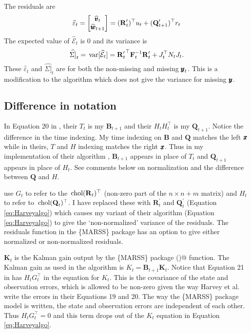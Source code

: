 \documentclass[]{article}
\def\UPS{\mbox{\boldmath $\Upsilon$}}
\def\BB{\mbox{$\mathbf B$}}	\def\bb{\mbox{$\mathbf b$}} \def\Bb{\mbox{$\mathbf J$}} \def\Ba{\mbox{$\mathbf L$}} \def\Bm{\UPS}
\def\FF{\mbox{$\mathbf F$}} \def\ff{\mbox{$\mathbf f$}}
\def\KK{\mbox{$\mathbf K$}}
\def\QQ{\mbox{$\mathbf Q$}}	 \def\qq{\mbox{$\mathbf q$}} \def\Qb{\mbox{$\mathbf G$}}  \def\Qm{\mathbb{Q}}
\def\RR{\mbox{$\mathbf R$}}	 \def\rr{\mbox{$\mathbf r$}} \def\Rb{\mbox{$\mathbf H$}}	\def\Rm{\mathbb{R}}
\def\chol{\,\textup{\textrm{chol}}}
\def\var{\,\textup{\textrm{var}}}
\def\hatwtp{\widehat{\ww}_{t+1}}
\def\hatvt{\widehat{\vv}_t}
\begin{document}
The residuals \citep[eqn 24]{Harveyetal1998} are
\begin{equation}\label{eq:Harveyresiduals}
\widehat{\varepsilon}_t = \begin{bmatrix}\hatvt\\ \hatwtp \end{bmatrix} =({\RR^\prime_t})^\top u_t + ({\QQ^\prime_{t+1}})^\top r_t
\end{equation}
The expected value of $\widehat{\mathcal{E}}_t$ is 0 and its variance is
\begin{equation}\label{eq:Harveyvariance}
\widehat{\Sigma]}_t = \var[\widehat{\mathcal{E}}_t] ={\RR^\prime_t}^\top \FF_t^{-1} \RR^\prime_t + J_t^\top N_t J_t .
\end{equation}
These $\widehat{\varepsilon}_t$ and $\widehat{\Sigma]}_t$ are for both the non-missing and missing $\mbox{$\pmb{y}$}_t$. This is a modification to the \citet{Harveyetal1998} algorithm which does not give the variance for missing $\mbox{$\pmb{y}$}$.

\subsection{Difference in notation}

In Equation 20 in \citet{Harveyetal1998}, their $T_t$ is my $\BB_{t+1}$ and their $H_t H_t^\top$ is my $\QQ_{t+1}$.  Notice the difference in the time indexing. My time indexing on $\BB$ and $\QQ$ matches the left $\mbox{$\pmb{x}$}$ while in theirs, $T$ and $H$ indexing matches the right $\mbox{$\pmb{x}$}$. Thus in my implementation of their algorithm \citep[eqns. 21-24]{Harveyetal1998}, $\BB_{t+1}$ appears in place of $T_t$ and $\QQ_{t+1}$ appears in place of $H_t$. See comments below on normalization and the difference between $\QQ$ and $H$. 

\citet[eqns. 19, 20]{Harveyetal1998} use $G_t$ to refer to the $\chol(\RR_t)^\top$ (non-zero part of the $n \times n+m$ matrix) and $H_t$ to refer to $\chol(\QQ_t)^\top$.  I have replaced these with $\RR_t^\prime$ and $\QQ_t^\prime$ (Equation \ref{eq:Harveyalgo}) which causes my variant of their algorithm (Equation \ref{eq:Harveyalgo}) to give the `non-normalized' variance of the residuals. The residuals function in the \{MARSS\} package has an option to give either normalized or non-normalized residuals.

$\KK_t$ is the Kalman gain output by the \{MARSS\} package \verb@MARSSkf()@ function.  The Kalman gain as used in the \citet{Harveyetal1998} algorithm is $K_t=\BB_{t+1}\KK_t$. Notice that Equation 21 in \citet{Harveyetal1998} has $H_t G_t^\top$ in the equation for $K_t$. This is the covariance of the state and observation errors, which is allowed to be non-zero given the way Harvey et al. write the errors in their Equations 19 and 20. The way the \{MARSS\} package model is written, the state and observation errors are independent of each other. Thus $H_t G_t^\top = 0$ and this term drops out of the $K_t$ equation in Equation \ref{eq:Harveyalgo}.
\end{document}
